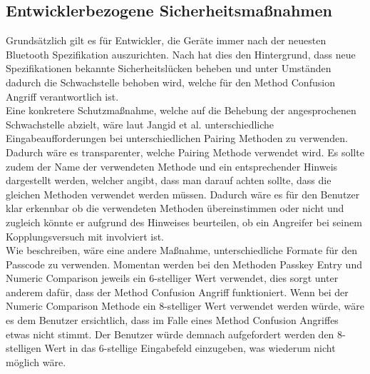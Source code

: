 \documentclass[
    a4paper,
    pagesize,
    pdftex,
    12pt,
]{scrartcl}
\begin{document}
    \subsection{Entwicklerbezogene Sicherheitsmaßnahmen}
    Grundsätzlich gilt es für Entwickler, die Geräte immer nach der neuesten Bluetooth Spezifikation auszurichten. Nach \cite{bluetooth_newest_security_risks} hat dies den Hintergrund, dass neue Spezifikationen bekannte Sicherheitslücken beheben und unter Umständen dadurch die Schwachstelle behoben wird, welche für den Method Confusion Angriff verantwortlich ist. \\
    Eine konkretere Schutzmaßnahme, welche auf die Behebung der angesprochenen Schwachstelle abzielt, wäre laut Jangid et al. \cite{bluetooth_formal_analysis} unterschiedliche Eingabeaufforderungen bei unterschiedlichen Pairing Methoden zu verwenden. Dadurch wäre es transparenter, welche Pairing Methode verwendet wird. Es sollte zudem der Name der verwendeten Methode und ein entsprechender Hinweis dargestellt werden, welcher angibt, dass man darauf achten sollte, dass die gleichen Methoden verwendet werden müssen. Dadurch wäre es für den Benutzer klar erkennbar ob die verwendeten Methoden übereinstimmen oder nicht und zugleich könnte er aufgrund des Hinweises beurteilen, ob ein Angreifer bei seinem Kopplungsversuch mit involviert ist. \\
    Wie \cite{bluetooth_formal_analysis} beschreiben, wäre eine andere Maßnahme, unterschiedliche Formate für den Passcode zu verwenden. Momentan werden bei den Methoden Passkey Entry und Numeric Comparison jeweils ein 6-stelliger Wert verwendet, dies sorgt unter anderem dafür, dass der Method Confusion Angriff funktioniert. Wenn bei der Numeric Comparison Methode ein 8-stelliger Wert verwendet werden würde, wäre es dem Benutzer ersichtlich, dass im Falle eines Method Confusion Angriffes etwas nicht stimmt. Der Benutzer würde demnach aufgefordert werden den 8-stelligen Wert in das 6-stellige Eingabefeld einzugeben, was wiederum nicht möglich wäre.

    \newpage
\end{document}
